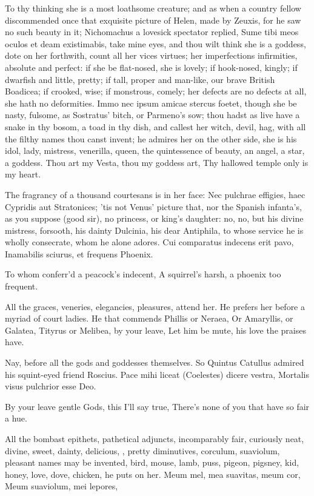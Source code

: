 To thy thinking she is a most loathsome creature; and as when a country
fellow discommended once that exquisite picture of Helen, made by
Zeuxis, for he saw no such beauty in it; Nichomachus a lovesick
spectator replied, Sume tibi meos oculos et deam existimabis, take mine
eyes, and thou wilt think she is a goddess, dote on her forthwith,
count all her vices virtues; her imperfections infirmities, absolute
and perfect: if she be flat-nosed, she is lovely; if hook-nosed,
kingly; if dwarfish and little, pretty; if tall, proper and man-like,
our brave British Boadicea; if crooked, wise; if monstrous, comely; her
defects are no defects at all, she hath no deformities. Immo nec ipsum
amicae stercus foetet, though she be nasty, fulsome, as Sostratus'
bitch, or Parmeno's sow; thou hadst as live have a snake in thy bosom,
a toad in thy dish, and callest her witch, devil, hag, with all the
filthy names thou canst invent; he admires her on the other side, she
is his idol, lady, mistress, venerilla, queen, the quintessence
of beauty, an angel, a star, a goddess.
Thou art my Vesta, thou my goddess art,
Thy hallowed temple only is my heart.

The fragrancy of a thousand courtesans is in her face: Nec
pulchrae effigies, haec Cypridis aut Stratonices; 'tis not Venus'
picture that, nor the Spanish infanta's, as you suppose (good sir), no
princess, or king's daughter: no, no, but his divine mistress,
forsooth, his dainty Dulcinia, his dear Antiphila, to whose service he
is wholly consecrate, whom he alone adores.
Cui comparatus indecens erit pavo,
Inamabilis sciurus, et frequens Phoenix.

To whom conferr'd a peacock's indecent,
A squirrel's harsh, a phoenix too frequent.

All the graces, veneries, elegancies, pleasures, attend her. He prefers
her before a myriad of court ladies.
He that commends Phillis or Neraea,
Or Amaryllis, or Galatea,
Tityrus or Melibea, by your leave,
Let him be mute, his love the praises have.

Nay, before all the gods and goddesses themselves. So Quintus
Catullus admired his squint-eyed friend Roscius.
Pace mihi liceat (Coelestes) dicere vestra,
Mortalis visus pulchrior esse Deo.

By your leave gentle Gods, this I'll say true,
There's none of you that have so fair a hue.

All the bombast epithets, pathetical adjuncts, incomparably fair,
curiously neat, divine, sweet, dainty, delicious, \etc{}, pretty
diminutives, corculum, suaviolum, \etc{} pleasant names may be invented,
bird, mouse, lamb, puss, pigeon, pigsney, kid, honey, love, dove,
chicken, \etc{} he puts on her.
Meum mel, mea suavitas, meum cor,
Meum suaviolum, mei lepores,

